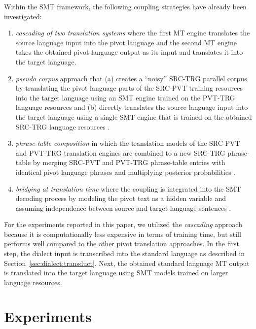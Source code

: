 \documentclass[english]{jnlp_1.4}
\begin{document}
 Within the SMT framework, the following coupling strategies have already been investigated:
 \begin{enumerate}
   \item {\em cascading of two translation systems} where the first MT engine translates the source language input into the pivot language
         and the second MT engine takes the obtained pivot language output as its input and translates it into the target language.
   \item {\em pseudo corpus} approach that (a) creates a ``noisy'' SRC-TRG parallel corpus by translating the pivot language parts
         of the SRC-PVT training resources into the target language using an SMT engine trained on the PVT-TRG language resources
         and (b) directly translates the source language input into the target language using a single SMT engine that is trained
         on the obtained SRC-TRG language resources \cite{lrec06:gispert}.
   \item {\em phrase-table composition} in which the translation models of the SRC-PVT and PVT-TRG translation engines are combined
         to a new SRC-TRG phrase-table by merging SRC-PVT and PVT-TRG phrase-table entries with identical pivot language phrases
         and multiplying posterior probabilities \cite{hlt07:utiyama,acl07:wu}.
   \item {\em bridging at translation time} where the coupling is integrated into the SMT decoding process by modeling the pivot text
         as a hidden variable and assuming independence between source and target language sentences \cite{iwslt08:TP:bertoldi}. 
 \end{enumerate}

 For the experiments reported in this paper, we utilized the {\em cascading} approach because it is computationally less expensive
 in terms of training time, but still performs well compared to the other pivot translation approaches.
 In the first step, the dialect input is transcribed into the standard language as described in Section~\ref{sec:dialect:transduct}.
 Next, the obtained standard language MT output is translated into the target language using SMT models trained on larger language resources.



\section{Experiments}
\label{sec:experiments}
\end{document}
